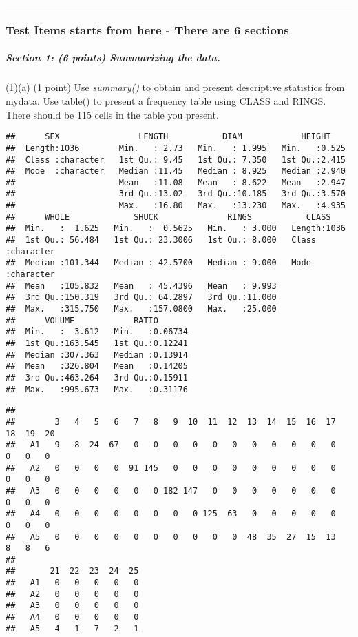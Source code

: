\documentclass[
]{article}
\begin{document}
\begin{center}\rule{0.5\linewidth}{0.5pt}\end{center}

\hypertarget{test-items-starts-from-here---there-are-6-sections}{%
\subsubsection{Test Items starts from here - There are 6
sections}\label{test-items-starts-from-here---there-are-6-sections}}

\hypertarget{section-1-6-points-summarizing-the-data.}{%
\subparagraph{Section 1: (6 points) Summarizing the
data.}\label{section-1-6-points-summarizing-the-data.}}

(1)(a) (1 point) Use \emph{summary()} to obtain and present descriptive
statistics from mydata. Use table() to present a frequency table using
CLASS and RINGS. There should be 115 cells in the table you present.

\begin{verbatim}
##      SEX                LENGTH           DIAM            HEIGHT     
##  Length:1036        Min.   : 2.73   Min.   : 1.995   Min.   :0.525  
##  Class :character   1st Qu.: 9.45   1st Qu.: 7.350   1st Qu.:2.415  
##  Mode  :character   Median :11.45   Median : 8.925   Median :2.940  
##                     Mean   :11.08   Mean   : 8.622   Mean   :2.947  
##                     3rd Qu.:13.02   3rd Qu.:10.185   3rd Qu.:3.570  
##                     Max.   :16.80   Max.   :13.230   Max.   :4.935  
##      WHOLE             SHUCK              RINGS           CLASS          
##  Min.   :  1.625   Min.   :  0.5625   Min.   : 3.000   Length:1036       
##  1st Qu.: 56.484   1st Qu.: 23.3006   1st Qu.: 8.000   Class :character  
##  Median :101.344   Median : 42.5700   Median : 9.000   Mode  :character  
##  Mean   :105.832   Mean   : 45.4396   Mean   : 9.993                     
##  3rd Qu.:150.319   3rd Qu.: 64.2897   3rd Qu.:11.000                     
##  Max.   :315.750   Max.   :157.0800   Max.   :25.000                     
##      VOLUME            RATIO        
##  Min.   :  3.612   Min.   :0.06734  
##  1st Qu.:163.545   1st Qu.:0.12241  
##  Median :307.363   Median :0.13914  
##  Mean   :326.804   Mean   :0.14205  
##  3rd Qu.:463.264   3rd Qu.:0.15911  
##  Max.   :995.673   Max.   :0.31176
\end{verbatim}

\begin{verbatim}
##     
##        3   4   5   6   7   8   9  10  11  12  13  14  15  16  17  18  19  20
##   A1   9   8  24  67   0   0   0   0   0   0   0   0   0   0   0   0   0   0
##   A2   0   0   0   0  91 145   0   0   0   0   0   0   0   0   0   0   0   0
##   A3   0   0   0   0   0   0 182 147   0   0   0   0   0   0   0   0   0   0
##   A4   0   0   0   0   0   0   0   0 125  63   0   0   0   0   0   0   0   0
##   A5   0   0   0   0   0   0   0   0   0   0  48  35  27  15  13   8   8   6
##     
##       21  22  23  24  25
##   A1   0   0   0   0   0
##   A2   0   0   0   0   0
##   A3   0   0   0   0   0
##   A4   0   0   0   0   0
##   A5   4   1   7   2   1
\end{verbatim}
\end{document}
